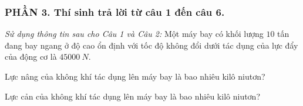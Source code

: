 \subsubsection*{PHẦN 3. Thí sinh trả lời từ câu 1 đến câu 6.}
\setcounter{ex}{0} 
\textit{Sử dụng thông tin sau cho Câu 1 và Câu 2:} Một máy bay có khối lượng $10$ tấn đang bay ngang ở độ cao ổn định với tốc độ không đổi dưới tác dụng của lực đẩy của động cơ là $45000\ N$.
\begin{ex}
Lực nâng của không khí tác dụng lên máy bay là bao nhiêu kilô niutơn?
\end{ex}
\begin{ex}
Lực cản của không khí tác dụng lên máy bay là bao nhiêu kilô niutơn?
 \end{ex}



